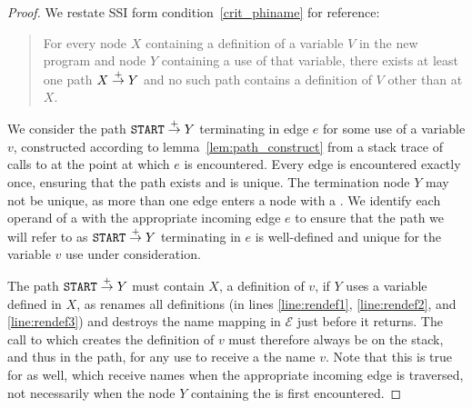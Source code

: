 \documentclass[12pt,titlepage,twoside]{article}
\begin{document}
\begin{proof}
We restate SSI form condition~\ref{crit_phiname} for reference:
\begin{quote}
For every node $X$ containing a definition of a variable $V$ in
the new program and node $Y$ containing a use of that variable, there
exists at least one path $X \stackrel{+}{\rightarrow} Y$ and no such path contains a
definition of $V$ other than at $X$.
\end{quote}
We consider the path $\texttt{START}\stackrel{+}{\rightarrow} Y$ terminating in edge $e$
for some use of a
variable $v$, constructed according to lemma~\ref{lem:path_construct}
from a stack trace of calls to  at the point at which $e$
is encountered.  Every edge is encountered exactly once, ensuring that
the path exists and is unique.  The termination node $Y$ may not be
unique, as more than one edge enters a node with a \phifunction.
We identify each operand of a \phifunction{} with the appropriate
incoming edge $e$ to ensure that the path we will refer to as 
$\texttt{START}\stackrel{+}{\rightarrow} Y$ terminating in $e$ is well-defined and
unique for the variable $v$ use under consideration.

The path $\texttt{START}\stackrel{+}{\rightarrow} Y$ must contain $X$, a definition of
$v$, if $Y$ uses a variable defined in $X$, as  renames
all definitions (in lines \ref{line:rendef1}, \ref{line:rendef2}, and
\ref{line:rendef3}) and destroys the name mapping in $\mathcal{E}$
just before it returns.  The call to  which creates the
definition of $v$ must therefore always be on the stack, and thus in
the path, for any use to receive a the name $v$.  Note that this is
true for  as well, which receive names when the
appropriate incoming edge is traversed, not necessarily when the node
$Y$ containing the \phifunction{} is first encountered.


\end{proof}
\end{document}
